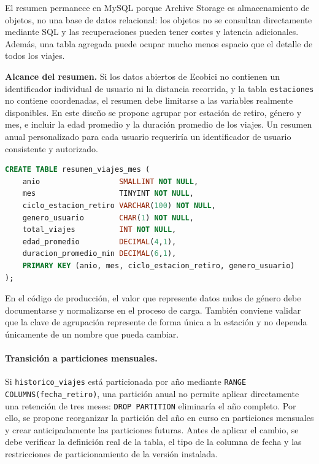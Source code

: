 \documentclass[10pt,a4paper]{article}
\begin{document}
El resumen permanece en MySQL porque Archive Storage es almacenamiento de objetos, no una base de datos relacional: los objetos no se consultan directamente mediante SQL y las recuperaciones pueden tener costes y latencia adicionales. Además, una tabla agregada puede ocupar mucho menos espacio que el detalle de todos los viajes.

\textbf{Alcance del resumen.} Si los datos abiertos de Ecobici no contienen un identificador individual de usuario ni la distancia recorrida, y la tabla \texttt{estaciones} no contiene coordenadas, el resumen debe limitarse a las variables realmente disponibles. En este diseño se propone agrupar por estación de retiro, género y mes, e incluir la edad promedio y la duración promedio de los viajes. Un resumen anual personalizado para cada usuario requeriría un identificador de usuario consistente y autorizado.

\begin{lstlisting}[language=SQL, caption={Tabla de resumen mensual}]
CREATE TABLE resumen_viajes_mes (
    anio                  SMALLINT NOT NULL,
    mes                   TINYINT NOT NULL,
    ciclo_estacion_retiro VARCHAR(100) NOT NULL,
    genero_usuario        CHAR(1) NOT NULL,
    total_viajes          INT NOT NULL,
    edad_promedio         DECIMAL(4,1),
    duracion_promedio_min DECIMAL(6,1),
    PRIMARY KEY (anio, mes, ciclo_estacion_retiro, genero_usuario)
);
\end{lstlisting}

En el código de producción, el valor que represente datos nulos de género debe documentarse y normalizarse en el proceso de carga. También conviene validar que la clave de agrupación represente de forma única a la estación y no dependa únicamente de un nombre que pueda cambiar.

\paragraph{Transición a particiones mensuales.}
Si \texttt{historico\_viajes} está particionada por año mediante \texttt{RANGE COLUMNS(fecha\_retiro)}, una partición anual no permite aplicar directamente una retención de tres meses: \texttt{DROP PARTITION} eliminaría el año completo. Por ello, se propone reorganizar la partición del año en curso en particiones mensuales y crear anticipadamente las particiones futuras. Antes de aplicar el cambio, se debe verificar la definición real de la tabla, el tipo de la columna de fecha y las restricciones de particionamiento de la versión instalada.
\end{document}
